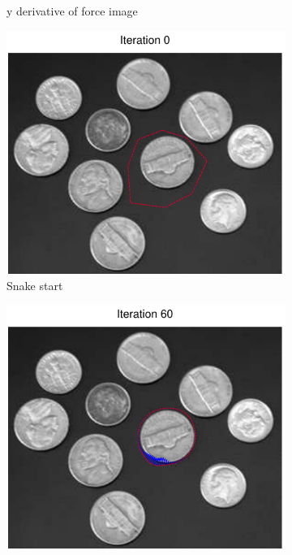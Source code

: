 \documentclass[11pt,a4paper]{article}
\begin{document}
\begin{figure}[H]
\begin{subfigure}[t]{0.21\textwidth}
        \caption{y derivative of force image}
        \label{fig:coins_log_fy}
    \end{subfigure}
    \begin{subfigure}[t]{0.21\textwidth}
        \includegraphics[width=\textwidth]{src/images/coins_log_0.pdf}
        \caption{Snake start}
        \label{fig:coins_log_0}
    \end{subfigure}
    \begin{subfigure}[t]{0.21\textwidth}
        \includegraphics[width=\textwidth]{src/images/coins_log_60.pdf}

\end{subfigure}
\end{figure}
\end{document}
